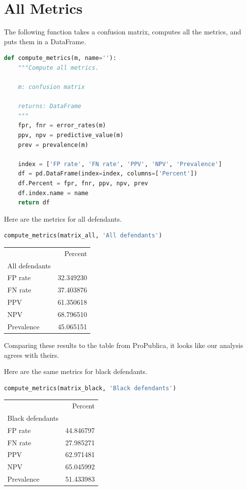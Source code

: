 \hypertarget{all-metrics}{%
\section{All Metrics}\label{all-metrics}}

The following function takes a confusion matrix, computes all the
metrics, and puts them in a DataFrame.

\begin{lstlisting}[language=Python,style=source]
def compute_metrics(m, name=''):
    """Compute all metrics.
    
    m: confusion matrix
    
    returns: DataFrame
    """
    fpr, fnr = error_rates(m)
    ppv, npv = predictive_value(m)
    prev = prevalence(m)
    
    index = ['FP rate', 'FN rate', 'PPV', 'NPV', 'Prevalence']
    df = pd.DataFrame(index=index, columns=['Percent'])
    df.Percent = fpr, fnr, ppv, npv, prev
    df.index.name = name
    return df
\end{lstlisting}

Here are the metrics for all defendants.

\begin{lstlisting}[language=Python,style=source]
compute_metrics(matrix_all, 'All defendants')
\end{lstlisting}

\begin{tabular}{lr}
\toprule
{} &    Percent \\
All defendants &            \\
\midrule
FP rate        &  32.349230 \\
FN rate        &  37.403876 \\
PPV            &  61.350618 \\
NPV            &  68.796510 \\
Prevalence     &  45.065151 \\
\bottomrule
\end{tabular}

Comparing these results to the table from ProPublica, it looks like our
analysis agrees with theirs.

Here are the same metrics for black defendants.

\begin{lstlisting}[language=Python,style=source]
compute_metrics(matrix_black, 'Black defendants')
\end{lstlisting}

\begin{tabular}{lr}
\toprule
{} &    Percent \\
Black defendants &            \\
\midrule
FP rate          &  44.846797 \\
FN rate          &  27.985271 \\
PPV              &  62.971481 \\
NPV              &  65.045992 \\
Prevalence       &  51.433983 \\
\bottomrule
\end{tabular}

